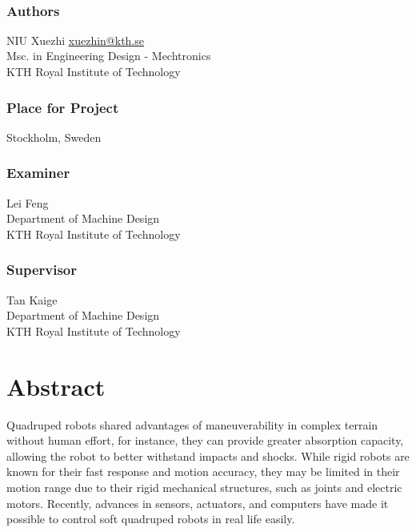 \newpage
\thispagestyle{plain}
~\\
\vfill
{ 
	\subsection*{Authors}
	NIU Xuezhi { }\href{mailto:xuezhin@kth.se}{\faEnvelope xuezhin@kth.se}\\
    Msc. in Engineering Design - Mechtronics \\
	KTH Royal Institute of Technology
	
	\subsection*{Place for Project}
	Stockholm, Sweden
	
	\subsection*{Examiner}
	Lei Feng \\
	Department of Machine Design \\
	KTH Royal Institute of Technology
	
	\subsection*{Supervisor }
	Tan Kaige\\
    Department of Machine Design\\
	KTH Royal Institute of Technology
	~
}


\newpage
\thispagestyle{plain}
\chapter*{Abstract}

Quadruped robots shared advantages of maneuverability in complex terrain without human effort, for instance, they can provide greater absorption capacity, allowing the robot to better withstand impacts and shocks. While rigid robots are known for their fast response and motion accuracy, they may be limited in their motion range due to their rigid mechanical structures, such as joints and electric motors. Recently, advances in sensors, actuators, and computers have made it possible to control soft quadruped robots in real life easily.

